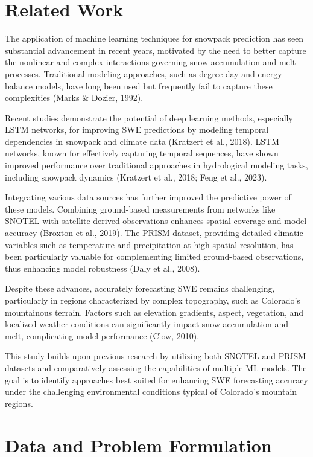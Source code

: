 \documentclass{article}
\begin{document}
\section{Related Work}
The application of machine learning techniques for snowpack prediction has seen substantial advancement in recent years, motivated by the need to better capture the nonlinear and complex interactions governing snow accumulation and melt processes. Traditional modeling approaches, such as degree-day and energy-balance models, have long been used but frequently fail to capture these complexities (Marks \& Dozier, 1992).

Recent studies demonstrate the potential of deep learning methods, especially LSTM networks, for improving SWE predictions by modeling temporal dependencies in snowpack and climate data (Kratzert et al., 2018). LSTM networks, known for effectively capturing temporal sequences, have shown improved performance over traditional approaches in hydrological modeling tasks, including snowpack dynamics (Kratzert et al., 2018; Feng et al., 2023).

Integrating various data sources has further improved the predictive power of these models. Combining ground-based measurements from networks like SNOTEL with satellite-derived observations enhances spatial coverage and model accuracy (Broxton et al., 2019). The PRISM dataset, providing detailed climatic variables such as temperature and precipitation at high spatial resolution, has been particularly valuable for complementing limited ground-based observations, thus enhancing model robustness (Daly et al., 2008).

Despite these advances, accurately forecasting SWE remains challenging, particularly in regions characterized by complex topography, such as Colorado's mountainous terrain. Factors such as elevation gradients, aspect, vegetation, and localized weather conditions can significantly impact snow accumulation and melt, complicating model performance (Clow, 2010).

This study builds upon previous research by utilizing both SNOTEL and PRISM datasets and comparatively assessing the capabilities of multiple ML models. The goal is to identify approaches best suited for enhancing SWE forecasting accuracy under the challenging environmental conditions typical of Colorado's mountain regions.

\section{Data and Problem Formulation}
\end{document}

